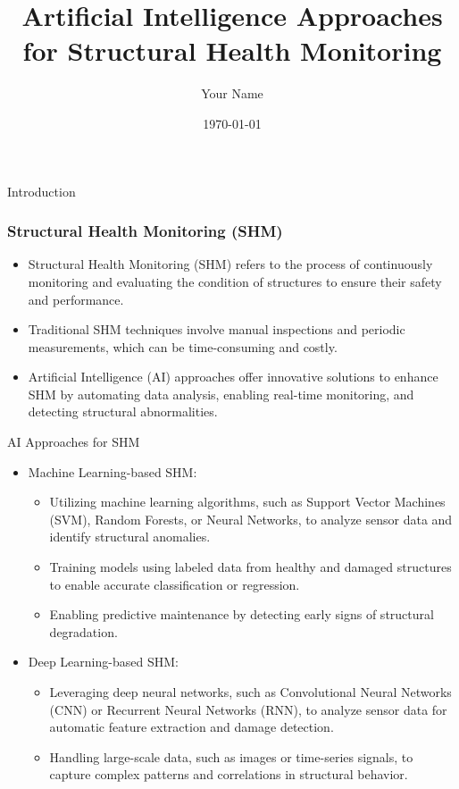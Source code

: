 \documentclass{beamer}
\title{Artificial Intelligence Approaches for Structural Health Monitoring}
\author{Your Name}
\date{\today}
\begin{document}
	
	\begin{frame}
		\titlepage
	\end{frame}
	
	\begin{frame}{Introduction}
		\frametitle{Structural Health Monitoring (SHM)}
		\begin{itemize}
			\item Structural Health Monitoring (SHM) refers to the process of continuously monitoring and evaluating the condition of structures to ensure their safety and performance.
			\item Traditional SHM techniques involve manual inspections and periodic measurements, which can be time-consuming and costly.
			\item Artificial Intelligence (AI) approaches offer innovative solutions to enhance SHM by automating data analysis, enabling real-time monitoring, and detecting structural abnormalities.
		\end{itemize}
	\end{frame}
	
	\begin{frame}{AI Approaches for SHM}
		\begin{itemize}
			\item Machine Learning-based SHM:
			\begin{itemize}
				\item Utilizing machine learning algorithms, such as Support Vector Machines (SVM), Random Forests, or Neural Networks, to analyze sensor data and identify structural anomalies.
				\item Training models using labeled data from healthy and damaged structures to enable accurate classification or regression.
				\item Enabling predictive maintenance by detecting early signs of structural degradation.
			\end{itemize}
			\item Deep Learning-based SHM:
			\begin{itemize}
				\item Leveraging deep neural networks, such as Convolutional Neural Networks (CNN) or Recurrent Neural Networks (RNN), to analyze sensor data for automatic feature extraction and damage detection.
				\item Handling large-scale data, such as images or time-series signals, to capture complex patterns and correlations in structural behavior.
			\end{itemize}
		\end{itemize}
	\end{frame}
	
\end{document}
